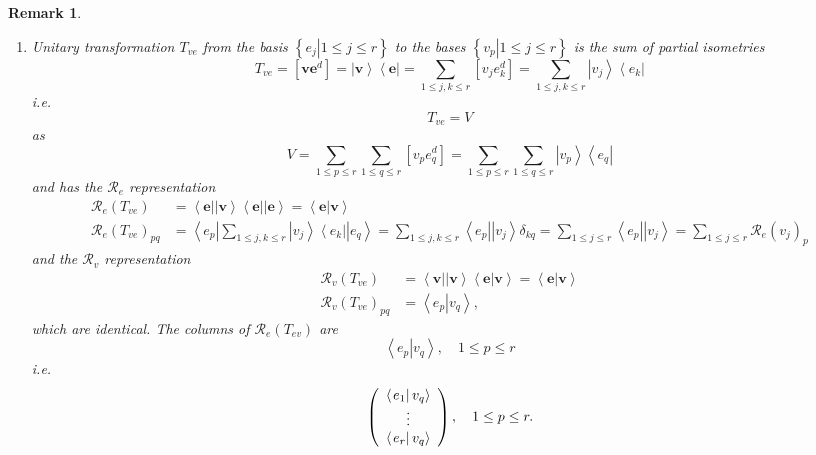 \documentclass[aps,preprint]{revtex4}%
\newtheorem{remark}[theorem]{Remark}
\begin{document}
\begin{remark}
\begin{enumerate}
\item Unitary transformation $T_{ve}$ from the basis $\left\{  \left.
e_{j}\right\vert 1\leq j\leq r\right\}  $ to the bases $\left\{  \left.
v_{p}\right\vert 1\leq j\leq r\right\}  $ is the sum of partial isometries
\begin{equation}
T_{ve}=\left[  \mathbf{ve}^{d}\right]  =\left\vert \mathbf{v}\right\rangle
\left\langle \mathbf{e}\right\vert =\sum_{1\leq j,k\leq r}\left[  v_{j}%
e_{k}^{d}\right]  =\sum_{1\leq j,k\leq r}\left\vert v_{j}\right\rangle
\left\langle e_{k}\right\vert
\end{equation}
i.e.%
\begin{equation}
T_{ve}=V
\end{equation}
as%
\begin{equation}
V=\sum_{1\leq p\leq r}\sum_{1\leq q\leq r}\left[  v_{p}e_{q}^{d}\right]
=\sum_{1\leq p\leq r}\sum_{1\leq q\leq r}\left\vert v_{p}\right\rangle
\left\langle e_{q}\right\vert
\end{equation}
and has the $\mathcal{R}_{e}$ representation
\begin{align}
\mathcal{R}_{e}\left(  T_{ve}\right)   &  =\left\langle \mathbf{e}\right\vert
\left\vert \mathbf{v}\right\rangle \left\langle \mathbf{e}\right\vert
\left\vert \mathbf{e}\right\rangle =\left\langle \left.  \mathbf{e}\right\vert
\mathbf{v}\right\rangle \\
\mathcal{R}_{e}\left(  T_{ve}\right)  _{pq}  &  =\left\langle e_{p}\right\vert
\sum_{1\leq j,k\leq r}\left\vert v_{j}\right\rangle \left\langle
e_{k}\right\vert \left\vert e_{q}\right\rangle =\sum_{1\leq j,k\leq
r}\left\langle e_{p}\right\vert \left\vert v_{j}\right\rangle \delta_{kq}%
=\sum_{1\leq j\leq r}\left\langle e_{p}\right\vert \left\vert v_{j}%
\right\rangle =\sum_{1\leq j\leq r}\mathcal{R}_{e}\left(  v_{j}\right)  _{p}%
\end{align}
and the $\mathcal{R}_{v}$ representation
\begin{align}
\mathcal{R}_{v}\left(  T_{ve}\right)   &  =\left\langle \mathbf{v}\left\vert
\left\vert \mathbf{v}\right\rangle \left\langle \mathbf{e}\right\vert \right.
\mathbf{v}\right\rangle =\left\langle \left.  \mathbf{e}\right\vert
\mathbf{v}\right\rangle \\
\mathcal{R}_{v}\left(  T_{ve}\right)  _{pq}  &  =\left\langle \left.
e_{p}\right\vert v_{q}\right\rangle ,
\end{align}
which are identical. The columns of $\mathcal{R}_{e}\left(  T_{ev}\right)  $
are
\begin{equation}
\left\langle \left.  e_{p}\right\vert v_{q}\right\rangle ,\quad1\leq p\leq r
\end{equation}
i.e.
\begin{equation}
\left(
\begin{array}
[c]{c}%
\left\langle \left.  e_{1}\right\vert v_{q}\right\rangle \\
\vdots\\
\left\langle \left.  e_{r}\right\vert v_{q}\right\rangle
\end{array}
\right)  ,\quad1\leq p\leq r.
\end{equation}



\end{enumerate}
\end{remark}
\end{document}
